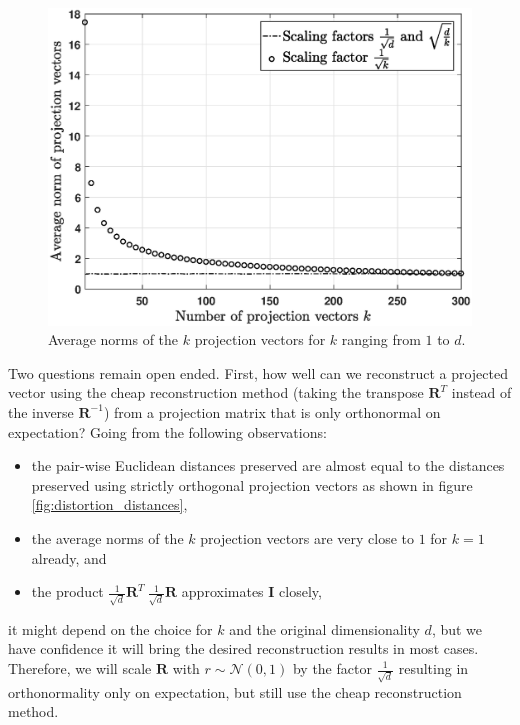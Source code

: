 \begin{figure}[h]
	{\centering
		\vspace{-0.1cm}
		\includegraphics[scale=0.4]{rp-method/Norms_projection_vectors}
		\vspace{-0.1cm}
		\caption{Average norms of the $k$ projection vectors for $k$ ranging from $1$ to $d$.}
		\label{fig:average_norms}}
\end{figure}

Two questions remain open ended. First, how well can we reconstruct a projected vector using the cheap reconstruction method (taking the transpose $\mathbf{R}^T$ instead of the inverse $\mathbf{R}^{-1}$) from a projection matrix that is only orthonormal on expectation? Going from the following observations:

\begin{itemize}
	\itemsep0em
	\item the pair-wise Euclidean distances preserved are almost equal to the distances preserved using strictly orthogonal projection vectors as shown in figure \ref{fig:distortion_distances},
	\item the average norms of the $k$ projection vectors are very close to $1$ for $k = 1$ already, and
	\item the product $\frac{1}{\sqrt{d}}\mathbf{R}^T \ \frac{1}{\sqrt{d}}\mathbf{R}$ approximates $\mathbf{I}$ closely,
\end{itemize}

\noindent it might depend on the choice for $k$ and the original dimensionality $d$, but we have confidence it will bring the desired reconstruction results in most cases. Therefore, we will scale $\mathbf{R}$ with $r \sim \mathcal{N}(0,1)$ by the factor $\frac{1}{\sqrt{d}}$ resulting in orthonormality only on expectation, but still use the cheap reconstruction method.

